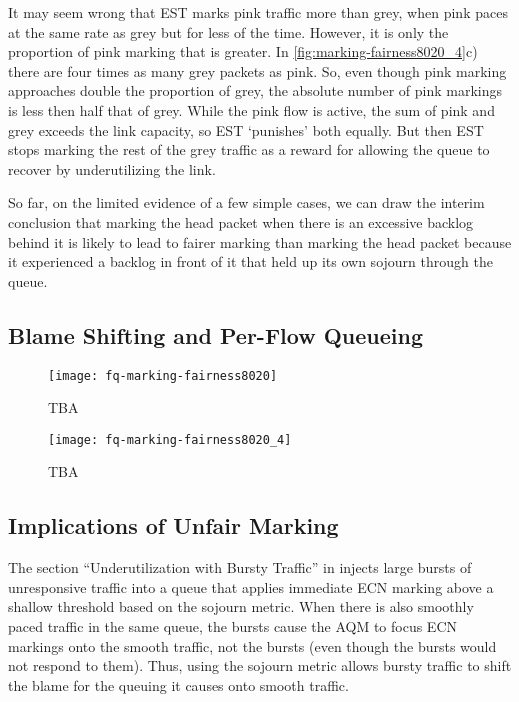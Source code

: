 It may seem wrong that EST marks pink traffic more than grey, when pink paces at the same rate as grey but for less of the time. However, it is only the proportion of pink marking that is greater. In \autoref{fig:marking-fairness8020_4}c) there are four times as many grey packets as pink. So, even though pink marking approaches double the proportion of grey, the absolute number of pink markings is less then half that of grey. While the pink flow is active, the sum of pink and grey exceeds the link capacity, so EST `punishes' both equally. But then EST stops marking the rest of the grey traffic as a reward for allowing the queue to recover by underutilizing the link.

So far, on the limited evidence of a few simple cases, we can draw the interim conclusion that marking the head packet when there is an excessive backlog behind it is likely to lead to fairer marking than marking the head packet because it experienced a backlog in front of it that held up its own sojourn through the queue. 

\subsection{Blame Shifting and Per-Flow Queueing}\label{sec:fq_blame_shifting}


\begin{figure}[h]
	\centering
	\texttt{[image: fq-marking-fairness8020]}
	\caption{TBA}\label{fig:fq-marking-fairness8020}
\end{figure}

\begin{figure}[h]
	\centering
	\texttt{[image: fq-marking-fairness8020\_4]}
	\caption{TBA}\label{fig:fq-marking-fairness8020_4}
\end{figure}


\subsection{Implications of Unfair Marking}\label{sec:effects_unfair_marking}

The section ``Underutilization with Bursty Traffic'' in \cite{Heist20:L4S_tests} injects large bursts of unresponsive traffic into a queue that applies immediate ECN marking above a shallow threshold based on the sojourn metric. When there is also smoothly paced traffic in the same queue, the bursts cause the AQM to focus ECN markings onto the smooth traffic, not the bursts (even though the bursts would not respond to them). Thus, using the sojourn metric allows bursty traffic to shift the blame for the queuing it causes onto smooth traffic.

